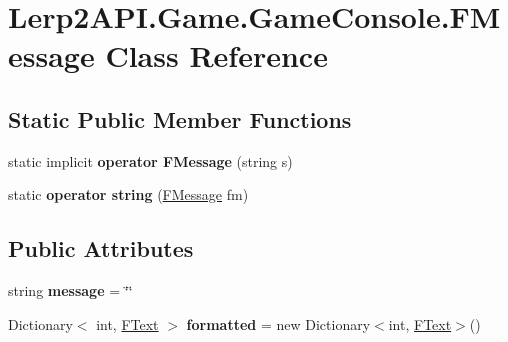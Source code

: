 \hypertarget{class_lerp2_a_p_i_1_1_game_1_1_game_console_1_1_f_message}{}\section{Lerp2\+A\+P\+I.\+Game.\+Game\+Console.\+F\+Message Class Reference}
\label{class_lerp2_a_p_i_1_1_game_1_1_game_console_1_1_f_message}
\subsection*{Static Public Member Functions}
\begin{DoxyCompactItemize}
\item 
\mbox{\label{class_lerp2_a_p_i_1_1_game_1_1_game_console_1_1_f_message_ae81eca15974b18adbb7938d76b35a834}} 
static implicit {\bfseries operator F\+Message} (string s)
\item 
\mbox{\label{class_lerp2_a_p_i_1_1_game_1_1_game_console_1_1_f_message_a984ac8aadb19232b53a887aa89a0dbef}} 
static {\bfseries operator string} (\hyperlink{class_lerp2_a_p_i_1_1_game_1_1_game_console_1_1_f_message}{F\+Message} fm)
\end{DoxyCompactItemize}
\subsection*{Public Attributes}
\begin{DoxyCompactItemize}
\item 
\mbox{\label{class_lerp2_a_p_i_1_1_game_1_1_game_console_1_1_f_message_aae4d078162de0b5a2b28bd036562f40e}} 
string {\bfseries message} = \char`\"{}\char`\"{}
\item 
\mbox{\label{class_lerp2_a_p_i_1_1_game_1_1_game_console_1_1_f_message_acc464c0f449366c179a9d8791942d406}} 
Dictionary$<$ int, \hyperlink{class_lerp2_a_p_i_1_1_game_1_1_game_console_1_1_f_text}{F\+Text} $>$ {\bfseries formatted} = new Dictionary$<$int, \hyperlink{class_lerp2_a_p_i_1_1_game_1_1_game_console_1_1_f_text}{F\+Text}$>$()
\end{DoxyCompactItemize}
